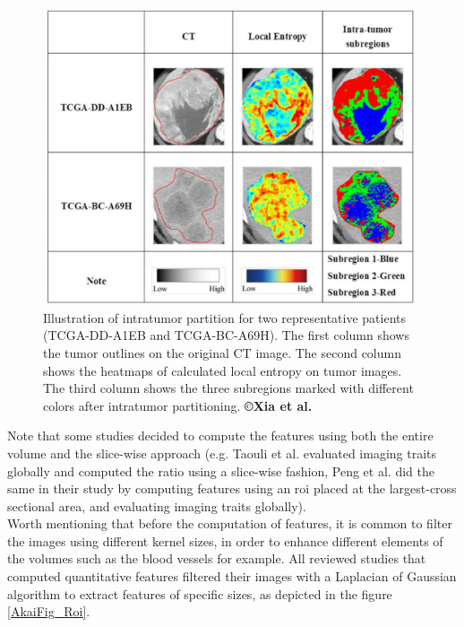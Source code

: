 \begin{figure}[ht!]
\centering
\includegraphics[width=4.34043in,height=3.46021in]{./images/image16.png}
\caption{Illustration of intratumor partition for two representative
patients (TCGA-DD-A1EB and TCGA-BC-A69H). The first column shows the
tumor outlines on the original CT image. The second column shows the
heatmaps of calculated local entropy on tumor images. The third column
shows the three subregions marked with different colors after intratumor
partitioning. \textbf{©Xia et al.} \cite{Xia2018}}
\label{XiaFig_subregions}
\end{figure}

Note that some studies decided to compute the features using both the
entire volume and the slice-wise approach (e.g. Taouli et al. \cite{Taouli2017}
evaluated imaging traits globally and computed the ratio using a
slice-wise fashion, Peng et al. \cite{Peng2018} did the same in their study by
computing features using an \ac{roi} placed at the largest-cross sectional
area, and evaluating imaging traits globally).\\
Worth mentioning that before the computation of features, it is common
to filter the images using different kernel sizes, in order to enhance
different elements of the volumes such as the blood vessels for example.
All reviewed studies that computed quantitative features filtered their
images with a Laplacian of Gaussian algorithm to extract features of specific sizes, as
depicted in the figure \ref{AkaiFig_Roi}.

